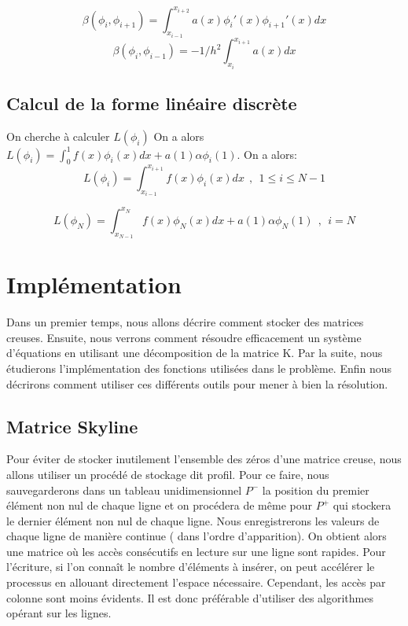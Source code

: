 \documentclass[a4paper,french,10pt]{article}
\begin{document}
\begin{equation*}
	\beta (\phi_i,\phi_{i+1})=\int_{x_{i-1}}^{x_{i+2}}a(x)\phi_i'(x)\phi_{i+1}'(x)dx
\end{equation*}
\begin{equation}
	\beta (\phi_i,\phi_{i-1})=-1/h^2\int_{x_{i}}^{x_{i+1}}a(x)dx
\end{equation}


\subsection{Calcul de la forme linéaire discrète}

On cherche à calculer $L(\phi_i)$ On a alors $L(\phi_i)=\int_{0}^{1}f(x)\phi_i(x)dx+a(1)\alpha \phi_i(1)$. On a alors:
\begin{equation*}
	L(\phi_i)=\int_{x_{i-1}}^{x_{i+1}}f(x)\phi_i(x)dx~~,~~1\leqslant i \leqslant N-1
\end{equation*}

\begin{equation*}
	L(\phi_N)=\int_{x_{N-1}}^{x_{N}}f(x)\phi_N(x)dx+a(1)\alpha \phi_N(1)~~,~~i = N
\end{equation*}




\newpage\section{Implémentation}
Dans un premier temps, nous allons décrire comment stocker des matrices creuses. Ensuite, nous verrons comment résoudre efficacement un système d'équations en utilisant une décomposition de la matrice K. Par la suite, nous étudierons l'implémentation des fonctions utilisées dans le problème. Enfin nous décrirons comment utiliser ces différents outils pour mener à bien la résolution.

\subsection{Matrice Skyline}
Pour éviter de stocker inutilement l'ensemble des zéros d'une matrice creuse, nous allons utiliser un procédé de stockage dit profil. Pour ce faire, nous sauvegarderons dans un tableau unidimensionnel $P^-$ la position du premier élément non nul de chaque ligne et on procédera de même pour $P^+$ qui stockera le dernier élément non nul de chaque ligne.
\newline\newline Nous enregistrerons les valeurs de chaque ligne de manière continue ( dans l'ordre d'apparition). On obtient alors une matrice où les accès consécutifs en lecture sur une ligne sont rapides. Pour l'écriture, si l'on connaît le nombre d'éléments à insérer, on peut accélérer le processus en allouant directement l'espace nécessaire. Cependant, les accès par colonne sont moins évidents. Il est donc préférable d'utiliser des algorithmes opérant sur les lignes.
\end{document}
